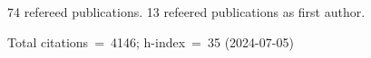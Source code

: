 74 refereed publications. 13 refeered publications as first author.

Total citations~=~4146; h-index~=~35 (2024-07-05)